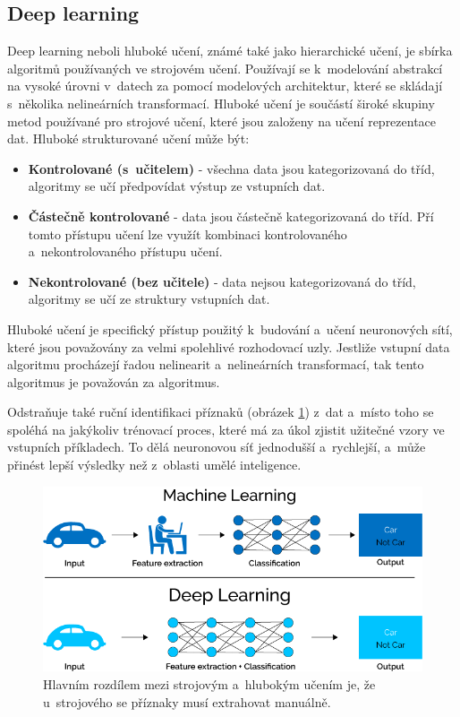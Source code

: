 \subsection{Deep learning}
Deep learning neboli hluboké učení, známé také jako hierarchické učení, je sbírka algoritmů používaných ve strojovém učení. Používají se k~modelování abstrakcí na vysoké úrovni v~datech za pomocí modelových architektur, které se skládají s~několika nelineárních transformací. Hluboké učení je součástí široké skupiny metod používané pro strojové učení, které jsou založeny na učení reprezentace dat. Hluboké strukturované učení může být:
\begin{itemize}
  \item{\textbf{Kontrolované (s~učitelem)} - všechna data jsou kategorizovaná do tříd, algoritmy se učí předpovídat výstup ze vstupních dat.}
  \item{\textbf{Částečně kontrolované} - data jsou částečně kategorizovaná do tříd. Pří tomto přístupu učení lze využít kombinaci kontrolovaného a~nekontrolovaného přístupu učení.}
  \item{\textbf{Nekontrolované (bez učitele)} - data nejsou kategorizovaná do tříd, algoritmy se učí ze struktury vstupních dat.}
\end{itemize}
Hluboké učení je specifický přístup použitý k~budování a~učení neuronových sítí, které jsou považovány za velmi spolehlivé rozhodovací uzly. Jestliže vstupní data algoritmu procházejí řadou nelinearit a~nelineárních transformací, tak tento algoritmus je považován za  algoritmus. 

Odstraňuje také ruční identifikaci příznaků (obrázek \ref{fig:ml_vs_ann}) z~dat a~místo toho se spoléhá na jakýkoliv trénovací proces, které má za úkol zjistit užitečné vzory ve vstupních příkladech. To dělá neuronovou síť jednodušší a~rychlejší, a~může přinést lepší výsledky než z~oblasti umělé inteligence.

\begin{figure}[H]
\centering
\includegraphics[width=.85\linewidth]{figures/ml_vs_ann}
\caption{Hlavním rozdílem mezi strojovým a~hlubokým učením je, že u~strojového se příznaky musí extrahovat manuálně. \cite{fig:mlvsann}}
\label{fig:ml_vs_ann}
\end{figure}

